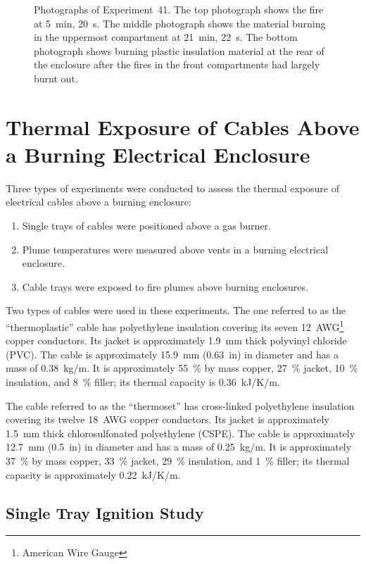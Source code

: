 \begin{figure}[p]
\caption[Photographs of Experiment~41]{Photographs of Experiment~41. The top photograph shows the fire at 5~min, 20~s. The middle photograph shows the material burning in the uppermost compartment at 21~min, 22~s. The bottom photograph shows burning plastic insulation material at the rear of the enclosure after the fires in the front compartments had largely burnt out. }
\label{fig:Test_41_photos}
\end{figure}






\clearpage

\section{Thermal Exposure of Cables Above a Burning Electrical Enclosure}
\label{Sec:Cables}
Three types of experiments were conducted to assess the thermal exposure of electrical cables above a burning enclosure:
\begin{enumerate}
\item Single trays of cables were positioned above a gas burner.
\item Plume temperatures were measured above vents in a burning electrical enclosure.
\item Cable trays were exposed to fire plumes above burning enclosures.
\end{enumerate}
Two types of cables were used in these experiments. The one referred to as the ``thermoplastic'' cable has polyethylene insulation covering its seven 12~AWG\footnote{American Wire Gauge} copper conductors. Its jacket is approximately 1.9~mm thick polyvinyl chloride (PVC). The cable is approximately 15.9~mm (0.63~in) in diameter and has a mass of 0.38~kg/m. It is approximately 55~\% by mass copper, 27~\% jacket, 10~\% insulation, and 8~\% filler; its thermal capacity is 0.36~kJ/K/m.

The cable referred to as the ``thermoset'' has cross-linked polyethylene insulation covering its twelve 18~AWG copper conductors. Its jacket is approximately 1.5~mm thick chlorosulfonated polyethylene (CSPE). The cable is approximately 12.7~mm (0.5~in) in diameter and has a mass of 0.25~kg/m. It is approximately 37~\% by mass copper, 33~\% jacket, 29~\% insulation, and 1~\% filler; its thermal capacity is approximately 0.22~kJ/K/m.

\subsection{Single Tray Ignition Study}

